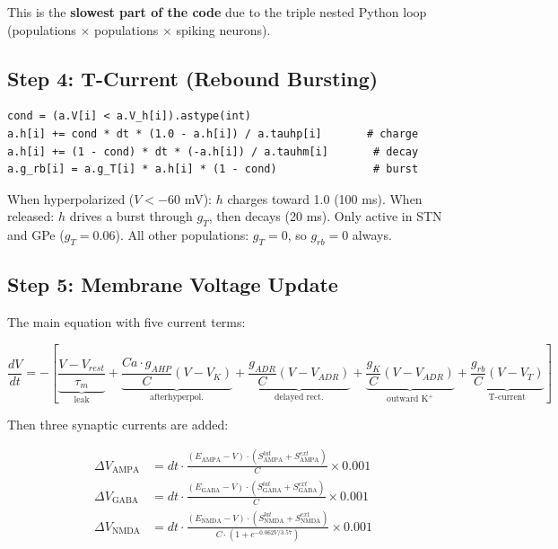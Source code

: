 \documentclass[11pt,a4paper]{article}
\begin{document}
This is the \textbf{slowest part of the code} due to the triple nested Python loop (populations $\times$ populations $\times$ spiking neurons).

\subsection{Step 4: T-Current (Rebound Bursting)}

\begin{lstlisting}
cond = (a.V[i] < a.V_h[i]).astype(int)
a.h[i] += cond * dt * (1.0 - a.h[i]) / a.tauhp[i]       # charge
a.h[i] += (1 - cond) * dt * (-a.h[i]) / a.tauhm[i]       # decay
a.g_rb[i] = a.g_T[i] * a.h[i] * (1 - cond)               # burst
\end{lstlisting}

When hyperpolarized ($V < -60$ mV): $h$ charges toward 1.0 (100 ms). When released: $h$ drives a burst through $g_T$, then decays (20 ms). Only active in STN and GPe ($g_T = 0.06$). All other populations: $g_T = 0$, so $g_{rb} = 0$ always.

\subsection{Step 5: Membrane Voltage Update}

The main equation with five current terms:

\begin{equation}
\frac{dV}{dt} = -\left[\underbrace{\frac{V - V_{rest}}{\tau_m}}_{\text{leak}} + \underbrace{\frac{Ca \cdot g_{AHP}}{C}(V - V_K)}_{\text{afterhyperpol.}} + \underbrace{\frac{g_{ADR}}{C}(V - V_{ADR})}_{\text{delayed rect.}} + \underbrace{\frac{g_K}{C}(V - V_{ADR})}_{\text{outward K}^+} + \underbrace{\frac{g_{rb}}{C}(V - V_T)}_{\text{T-current}}\right]
\end{equation}

Then three synaptic currents are added:

\begin{align}
\Delta V_{\text{AMPA}} &= dt \cdot \frac{(E_{\text{AMPA}} - V) \cdot (S^{lat}_{\text{AMPA}} + S^{ext}_{\text{AMPA}})}{C} \times 0.001 \\
\Delta V_{\text{GABA}} &= dt \cdot \frac{(E_{\text{GABA}} - V) \cdot (S^{lat}_{\text{GABA}} + S^{ext}_{\text{GABA}})}{C} \times 0.001 \\
\Delta V_{\text{NMDA}} &= dt \cdot \frac{(E_{\text{NMDA}} - V) \cdot (S^{lat}_{\text{NMDA}} + S^{ext}_{\text{NMDA}})}{C \cdot (1 + e^{-0.062 V / 3.57})} \times 0.001
\end{align}
\end{document}
